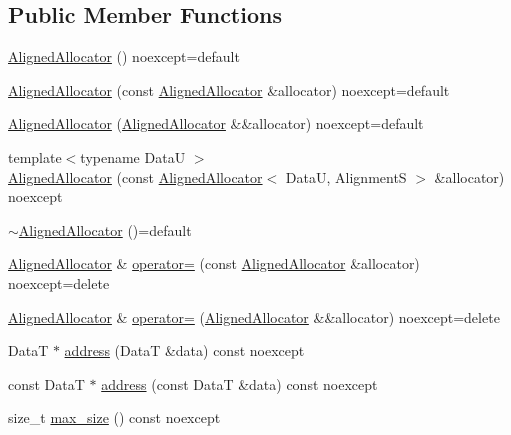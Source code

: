 \subsection*{Public Member Functions}
\begin{DoxyCompactItemize}
\item 
\hyperlink{structmage_1_1_aligned_allocator_a95363950f216346db818997988be73bf}{Aligned\+Allocator} () noexcept=default
\item 
\hyperlink{structmage_1_1_aligned_allocator_a05c42833aa1391f95c3cd51be7c19273}{Aligned\+Allocator} (const \hyperlink{structmage_1_1_aligned_allocator}{Aligned\+Allocator} \&allocator) noexcept=default
\item 
\hyperlink{structmage_1_1_aligned_allocator_aefc95d55846c11bac240452247fab11e}{Aligned\+Allocator} (\hyperlink{structmage_1_1_aligned_allocator}{Aligned\+Allocator} \&\&allocator) noexcept=default
\item 
{\footnotesize template$<$typename DataU $>$ }\\\hyperlink{structmage_1_1_aligned_allocator_a728d237ac0ae50bcc593a94f6e4cd4fc}{Aligned\+Allocator} (const \hyperlink{structmage_1_1_aligned_allocator}{Aligned\+Allocator}$<$ DataU, AlignmentS $>$ \&allocator) noexcept
\item 
\hyperlink{structmage_1_1_aligned_allocator_a98bda5c375a177eaa71cd622622451eb}{$\sim$\+Aligned\+Allocator} ()=default
\item 
\hyperlink{structmage_1_1_aligned_allocator}{Aligned\+Allocator} \& \hyperlink{structmage_1_1_aligned_allocator_a4620c8e53ecc7294ff90d07e956810ed}{operator=} (const \hyperlink{structmage_1_1_aligned_allocator}{Aligned\+Allocator} \&allocator) noexcept=delete
\item 
\hyperlink{structmage_1_1_aligned_allocator}{Aligned\+Allocator} \& \hyperlink{structmage_1_1_aligned_allocator_a0fec7e9e30d91e215d33416dde9ef527}{operator=} (\hyperlink{structmage_1_1_aligned_allocator}{Aligned\+Allocator} \&\&allocator) noexcept=delete
\item 
DataT $\ast$ \hyperlink{structmage_1_1_aligned_allocator_a8c7fc099279194e37afa8e4dae1a64fa}{address} (DataT \&data) const noexcept
\item 
const DataT $\ast$ \hyperlink{structmage_1_1_aligned_allocator_afd76c25aa8f6918172c8e0ac8146963a}{address} (const DataT \&data) const noexcept
\item 
size\+\_\+t \hyperlink{structmage_1_1_aligned_allocator_a81ac9662f40f1708d6f8d4e93fa8ee08}{max\+\_\+size} () const noexcept
\item 

\end{DoxyCompactItemize}
